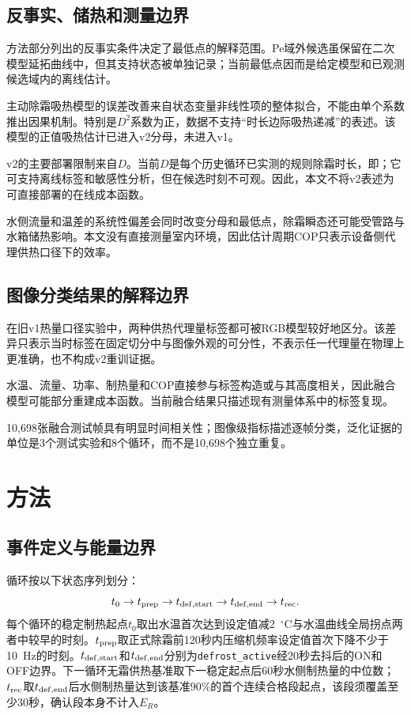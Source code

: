\documentclass[UTF8,11pt,a4paper]{ctexart}
\begin{document}
\subsection{反事实、储热和测量边界}
方法部分列出的反事实条件决定了最低点的解释范围。Pe域外候选虽保留在二次模型延拓曲线中，但其支持状态被单独记录；当前最低点因而是给定模型和已观测候选域内的离线估计。

主动除霜吸热模型的误差改善来自状态变量非线性项的整体拟合，不能由单个系数推出因果机制。特别是$D^2$系数为正，数据不支持“时长边际吸热递减”的表述。该模型的正值吸热估计已进入v2分母，未进入v1。

v2的主要部署限制来自$D$。当前$D$是每个历史循环已实测的规则除霜时长，即；它可支持离线标签和敏感性分析，但在候选时刻不可观。因此，本文不将v2表述为可直接部署的在线成本函数。

水侧流量和温差的系统性偏差会同时改变分母和最低点，除霜瞬态还可能受管路与水箱储热影响。本文没有直接测量室内环境，因此估计周期COP只表示设备侧代理供热口径下的效率。

\subsection{图像分类结果的解释边界}
在旧v1热量口径实验中，两种供热代理量标签都可被RGB模型较好地区分。该差异只表示当时标签在固定切分中与图像外观的可分性，不表示任一代理量在物理上更准确，也不构成v2重训证据。

水温、流量、功率、制热量和COP直接参与标签构造或与其高度相关，因此融合模型可能部分重建成本函数。当前融合结果只描述现有测量体系中的标签复现。

10,698张融合测试帧具有明显时间相关性；图像级指标描述逐帧分类，泛化证据的单位是3个测试实验和8个循环，而不是10,698个独立重复。

\section{方法}
\subsection{事件定义与能量边界}
循环按以下状态序列划分：
\[
t_0\rightarrow t_{\rm prep}\rightarrow t_{\rm def,start}
\rightarrow t_{\rm def,end}\rightarrow t_{\rm rec}.
\]
每个循环的稳定制热起点$t_0$取出水温首次达到设定值减2~$^\circ$C与水温曲线全局拐点两者中较早的时刻。$t_{\rm prep}$取正式除霜前120秒内压缩机频率设定值首次下降不少于10~Hz的时刻。$t_{\rm def,start}$和$t_{\rm def,end}$分别为\texttt{defrost\_active}经20秒去抖后的ON和OFF边界。下一循环无霜供热基准取下一稳定起点后60秒水侧制热量的中位数；$t_{\rm rec}$取$t_{\rm def,end}$后水侧制热量达到该基准90\%的首个连续合格段起点，该段须覆盖至少30秒，确认段本身不计入$E_R$。
\end{document}
